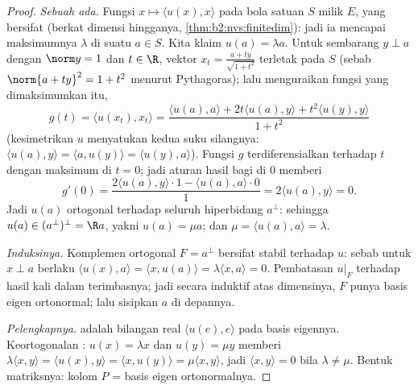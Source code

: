 \begin{proof}
\emph{Sebuah  ada.} Fungsi $x \mapsto \langle u(x),
x\rangle$  pada bola satuan $S$ milik $E$, yang bersifat
 (berkat dimensi hingganya, \cref{thm:b2:nvs:finitedim}): jadi ia
mencapai maksimumnya $\lambda$ di suatu $a \in S$. Kita klaim $u(a) = \lambda
a$. Untuk sembarang $y \perp a$ dengan $\norm y = 1$ dan $t \in \R$,
vektor $x_t = \frac{a + ty}{\sqrt{1 + t^2}}$ terletak pada $S$
(sebab $\norm{a + ty}^2 = 1 + t^2$ menurut Pythagoras); lalu menguraikan
fungsi yang dimaksimumkan itu,
\[
g(t) = \langle u(x_t), x_t\rangle
= \frac{\langle u(a), a\rangle + 2t\langle u(a), y\rangle +
t^2\langle u(y), y\rangle}{1 + t^2}
\]
(kesimetrikan $u$ menyatukan kedua suku silangnya: $\langle u(a),
y\rangle = \langle a, u(y)\rangle = \langle u(y), a\rangle$).
Fungsi $g$ terdiferensialkan terhadap $t$ dengan maksimum di $t =
0$; jadi aturan hasil bagi di $0$ memberi
\[
g'(0) = \frac{2\langle u(a), y\rangle\cdot 1 - \langle u(a),
a\rangle\cdot 0}{1} = 2\langle u(a), y\rangle = 0 .
\]
Jadi $u(a)$ ortogonal terhadap seluruh hiperbidang $a^\perp$: sehingga $u(a)
\in (a^{\perp})^{\perp} = \R a$, yakni $u(a) = \mu a$; dan $\mu =
\langle u(a), a\rangle = \lambda$.

\emph{Induksinya.} Komplemen ortogonal $F = a^\perp$ bersifat
stabil terhadap $u$: sebab untuk $x \perp a$ berlaku $\langle u(x), a\rangle = \langle x,
u(a)\rangle = \lambda\langle x, a\rangle = 0$. Pembatasan
$u|_F$  terhadap hasil kali dalam terimbasnya; jadi secara induktif atas
dimensinya, $F$ punya basis eigen ortonormal; lalu sisipkan $a$ di depannya.

\emph{Pelengkapnya.}  adalah bilangan real $\langle u(e),
e\rangle$ pada basis eigennya. Keortogonalan : $u(x) =
\lambda x$ dan $u(y) = \mu y$ memberi $\lambda\langle x, y\rangle =
\langle u(x), y\rangle = \langle x, u(y)\rangle = \mu\langle x,
y\rangle$, jadi $\langle x, y\rangle = 0$ bila $\lambda \neq \mu$.
Bentuk matriksnya: kolom $P$ = basis eigen ortonormalnya.
\end{proof}

